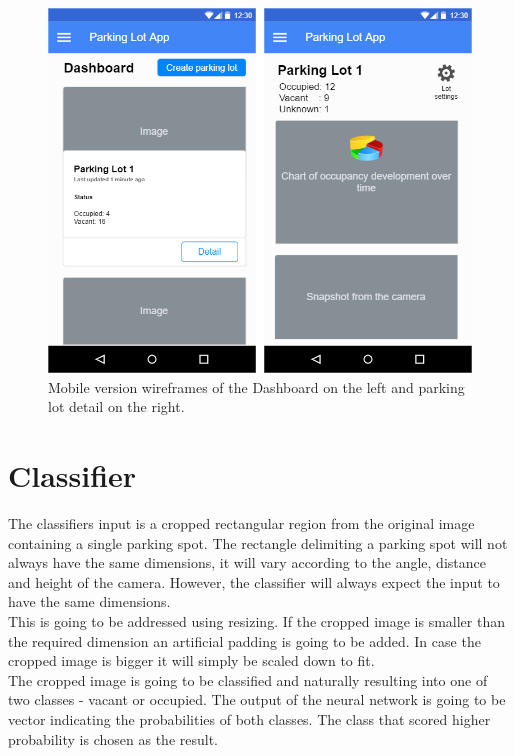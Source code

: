 \documentclass[thesis=M,english]{FITthesis}[2019/03/06]
\begin{document}
\begin{figure}[ht!]
	\centering
	\includegraphics[scale=0.5]{imgs/wf-mobile.png}
	\caption{Mobile version wireframes of the Dashboard on the left and parking lot detail on the right.}
	\label{label:diagram_mobile}
\end{figure}

\section{Classifier}
The classifiers input is a cropped rectangular region from the original image containing a single parking spot. The rectangle delimiting a parking spot will not always have the same dimensions, it will vary according to the angle, distance and height of the camera. However, the classifier will always expect the input to have the same dimensions. \\

This is going to be addressed using resizing. If the cropped image is smaller than the required dimension an artificial padding is going to be added. In case the cropped image is bigger it will simply be scaled down to fit.\\

The cropped image is going to be classified and naturally resulting into one of two classes - vacant or occupied. The output of the neural network is going to be vector indicating the probabilities of both classes. The class that scored higher probability is chosen as the result.
\end{document}
